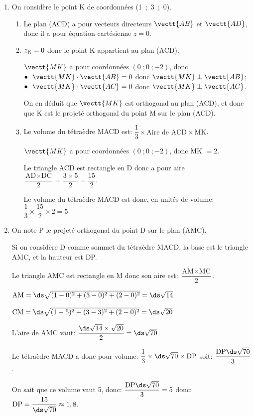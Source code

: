 \begin{enumerate}[resume]
\item On considère le point K de coordonnées (1~;~3~;~0).
	\begin{enumerate}
		\item
Le plan (ACD) a pour vecteurs directeurs $\vectt{AB}$ et $\vectt{AD}$, donc il a pour équation cartésienne $z=0$.
		
		\item 
$z_{\text K}=0$ donc le point K appartient au plan (ACD).

$\vectt{MK}$ a pour coordonnées $(0\;; 0\;; -2)$, donc \\
$\bullet~~\vectt{MK}\cdot\vectt{AB} = 0$ donc $\vectt{MK}\perp\vectt{AB}$;\\
$\bullet~~\vectt{MK}\cdot\vectt{AC} = 0$ donc $\vectt{MK}\perp\vectt{AC}$.

On en déduit que $\vectt{MK}$ est orthogonal au plan (ACD), et donc que K est le projeté orthogonal du point M sur le plan (ACD).
	
		\item Le volume du tétraèdre MACD est:
$\dfrac{1}{3}\times \text{Aire de ACD} \times \text{MK}$.

$\vectt{MK}$ a pour coordonnées $(0\;; 0\;; -2)$, donc MK $=2$.

Le triangle ACD est rectangle en D donc a pour aire 
$\dfrac{\text{AD}\times\text{DC}}{2}=\dfrac{ 3\times 5}{2}=\dfrac{15}{2}$.

Le volume du tétraèdre MACD est donc, en unités de volume:
$\dfrac{1}{3} \times \dfrac{15}{2} \times 2 = 5$.

\end{enumerate}	
	
\item On note P le projeté orthogonal du point D sur le plan (AMC).



Si on considère D comme sommet du tétraèdre MACD, la base est le triangle AMC, et la hauteur est DP.

Le triangle AMC est rectangle en M donc son aire est:
$\dfrac{\text{AM} \times \text{MC}}{2}$.

$\text{AM} = \ds\sqrt{(1-0)^2+(3-0)^2+(2-0)^2} = \ds\sqrt{14}$

$\text{CM} = \ds\sqrt{(1-5)^2+(3-3)^2+(2-0)^2}= \ds\sqrt{20}$

L'aire de AMC vaut: $\dfrac{\ds\sqrt{14}\times \sqrt{20}}{2}=\ds\sqrt{70}$.

Le tétraèdre MACD a donc pour volume: $\dfrac{1}{3}\times\ds\sqrt{70}\times\text{DP}$ soit: $\dfrac{\text{DP} \ds\sqrt{70}}{3}$.

On sait que ce volume vaut 5, donc: 
$\dfrac{\text{DP} \ds\sqrt{70}}{3} = 5$ donc:
$\text{DP}= \dfrac{15}{\ds\sqrt{70}} \approx 1,8$.
\end{enumerate}
